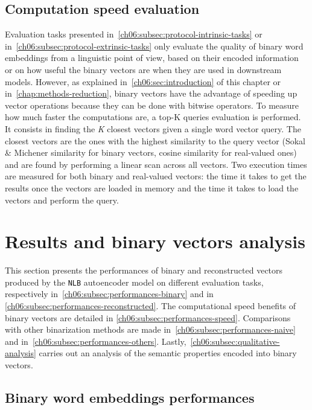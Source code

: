   \subsection{Computation speed evaluation}
    \label{ch06:subsec:protocol-speed-task}
    Evaluation tasks presented in~\autoref{ch06:subsec:protocol-intrinsic-tasks}
    or in~\autoref{ch06:subsec:protocol-extrinsic-tasks} only evaluate the
    quality of binary word embeddings from a linguistic point of view, based on
    their encoded information or on how useful the binary vectors are when they
    are used in downstream models. However, as explained
    in~\autoref{ch06:sec:introduction} of this chapter or
    in~\autoref{chap:methods-reduction}, binary vectors have the advantage of
    speeding up vector operations because they can be done with bitwise
    operators. To measure how much faster the computations are, a top-K queries
    evaluation is performed. It consists in finding the \textit{K} closest
    vectors given a single word vector query. The closest vectors are the ones
    with the highest similarity to the query vector (Sokal \& Michener
    similarity for binary vectors, cosine similarity for real-valued ones) and
    are found by performing a linear scan across all vectors. Two execution
    times are measured for both binary and real-valued vectors: the time it
    takes to get the results once the vectors are loaded in memory and the time
    it takes to load the vectors and perform the query.\medskip

\section{Results and binary vectors analysis}
  \label{ch06:sec:nlb-results}
  This section presents the performances of binary and reconstructed vectors
  produced by the \texttt{NLB} autoencoder model on different evaluation tasks,
  respectively in~\autoref{ch06:subsec:performances-binary} and in
  \autoref{ch06:subsec:performances-reconstructed}. The computational speed
  benefits of binary vectors are detailed in
  \autoref{ch06:subsec:performances-speed}. Comparisons with other binarization
  methods are made in~\autoref{ch06:subsec:performances-naive} and
  in~\autoref{ch06:subsec:performances-others}.
  Lastly,~\autoref{ch06:subsec:qualitative-analysis} carries out an analysis of
  the semantic properties encoded into binary vectors.

  \subsection{Binary word embeddings performances}
    \label{ch06:subsec:performances-binary}
